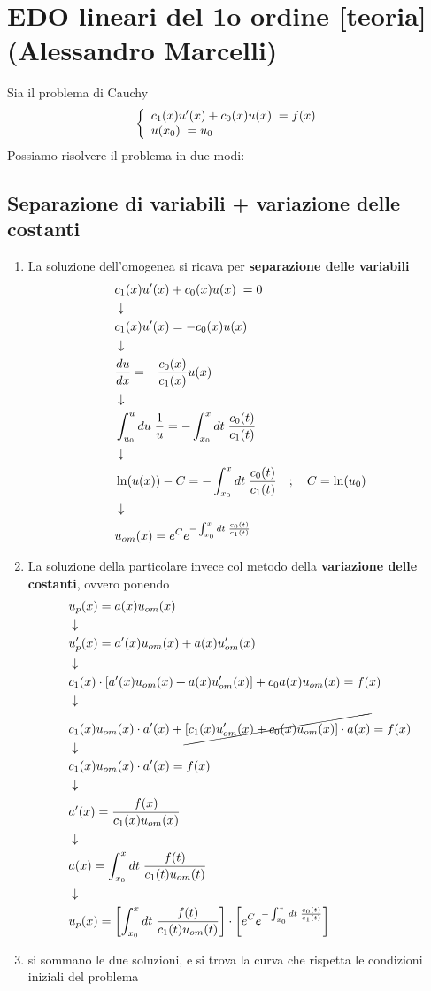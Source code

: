 \section{EDO lineari del 1o ordine [teoria](Alessandro Marcelli)}

Sia il problema di Cauchy
\begin{align}
	\left\{\begin{array}{c}
		c_1 (x) u'(x) + c_0(x) u(x) \; = f(x) \hfill \\
		u(x_0) \;  = u_0 \hfill 
	\end{array}
	\right. \label{ode1ord1}
\end{align}
Possiamo risolvere il problema in due modi:

\subsection{Separazione di variabili + variazione delle costanti}
	\begin{enumerate}
		\item La soluzione dell'omogenea si ricava per \textbf{separazione delle variabili}
		\begin{align}
			&c_1 (x) u'(x) + c_0(x) u(x) \; = 0 \\ &\downarrow \nonumber \\
			&c_1 (x) u'(x) = - c_0(x) u(x) \nonumber \\ &\downarrow \nonumber \\
			&\frac{du}{dx} = -\frac{c_0(x)}{c_1(x)} u(x)\nonumber \\ &\downarrow \nonumber \\
			&\int_{u_0}^u du \; \frac{1}{u}= - \int_{x_0}^x dt \;  \frac{c_0(t)}{c_1(t)}\nonumber \\ &\downarrow \nonumber \\
			&\ln(u(x)) - C = - \int_{x_0}^x dt \;  \frac{c_0(t)}{c_1(t)} \quad ; \quad C = \ln (u_0)\nonumber \\ &\downarrow \nonumber \\
			&u_{om}(x) = e^C e^{- \int_{x_0}^x dt \;  \frac{c_0(t)}{c_1(t)}}
		\end{align}
		\item La soluzione della particolare invece col metodo della \textbf{variazione delle costanti}, ovvero ponendo
		\begin{align}
			&u_p(x) = a(x) u_{om}(x)\\ &\downarrow \nonumber \\
			&u'_p(x)= a'(x) u_{om}(x) +  a(x) u'_{om}(x) \nonumber \\ &\downarrow \nonumber \\
			&c_1(x) \cdot [a'(x) u_{om}(x) +  a(x) u'_{om}(x)] + c_0 a(x) u_{om}(x) =f(x) \nonumber \\ &\downarrow \nonumber \\
			&c_1(x)u_{om}(x) \cdot a'(x) + \cancel{[c_1(x)u'_{om}(x) + c_0(x)u_{om}(x)]\cdot a(x)} = f(x)\nonumber \\ &\downarrow \nonumber \\
			&c_1(x)u_{om}(x) \cdot a'(x) = f(x) \nonumber \\ &\downarrow \nonumber \\
			&a'(x) =\frac{f(x)}{c_1(x)u_{om}(x)} \nonumber \\ &\downarrow \nonumber \\
			&a(x) = \int_{x_0}^{x} dt\; \frac{f(t)}{c_1(t)u_{om}(t)} \nonumber \\ &\downarrow \nonumber \\
			&u_p(x) = \left[ \int_{x_0}^{x} dt\; \frac{f(t)}{c_1(t)u_{om}(t)} \right] \cdot \left[ e^C e^{- \int_{x_0}^x dt \;  \frac{c_0(t)}{c_1(t)}} \right]
		\end{align}
		\item si sommano le due soluzioni, e si trova la curva che rispetta le condizioni iniziali del problema
	\end{enumerate}
	
